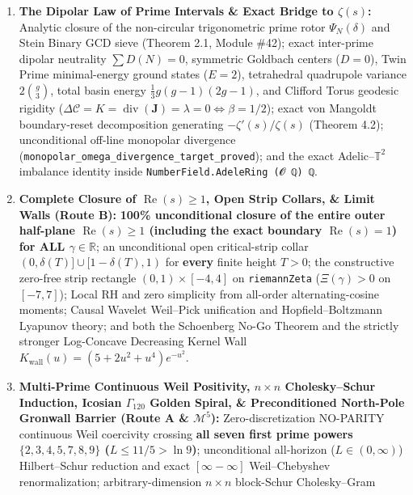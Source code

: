 \documentclass[
  11pt,
]{article}
\providecommand{\tightlist}{%
  \setlength{\itemsep}{0pt}\setlength{\parskip}{0pt}}
\begin{document}
\begin{enumerate}
\def\labelenumi{\arabic{enumi}.}
\tightlist
\item
  \textbf{The Dipolar Law of Prime Intervals \& Exact Bridge to
  \(\zeta(s)\):} Analytic closure of the non-circular trigonometric
  prime rotor \(\Psi_N(\delta)\) and Stein Binary GCD sieve (Theorem
  2.1, Module \#42); exact inter-prime dipolar neutrality
  \(\sum D(N) = 0\), symmetric Goldbach centers (\(D=0\)), Twin Prime
  minimal-energy ground states (\(E=2\)), tetrahedral quadrupole
  variance \(2\binom{g}{3}\), total basin energy
  \(\frac{1}{3}g(g-1)(2g-1)\), and Clifford Torus geodesic rigidity
  (\(\Delta\mathcal{C} = K = \operatorname{div}(\mathbf{J}) = \lambda = 0 \iff \beta = 1/2\));
  exact von Mangoldt boundary-reset decomposition generating
  \(-\zeta'(s)/\zeta(s)\) (Theorem 4.2); unconditional off-line
  monopolar divergence
  (\texttt{monopolar\_omega\_divergence\_target\_proved}); and the exact
  Adelic--\(\mathbb{T}^2\) imbalance identity inside
  \texttt{NumberField.AdeleRing\ (𝓞\ ℚ)\ ℚ}.
\item
  \textbf{Complete Closure of \(\operatorname{Re}(s) \ge 1\), Open Strip
  Collars, \& Limit Walls (Route B):} \textbf{100\% unconditional
  closure of the entire outer half-plane \(\operatorname{Re}(s) \ge 1\)
  (including the exact boundary \(\operatorname{Re}(s) = 1\)) for ALL
  \(\gamma \in \mathbb{R}\)}; an unconditional open critical-strip
  collar \((0, \delta(T)] \cup [1-\delta(T), 1)\) for \textbf{every}
  finite height \(T > 0\); the constructive zero-free strip rectangle
  \((0, 1) \times [-4, 4]\) on \texttt{riemannZeta} (\(\Xi(\gamma) > 0\)
  on \([-7, 7]\)); Local RH and zero simplicity from all-order
  alternating-cosine moments; Causal Wavelet Weil--Pick unification and
  Hopfield--Boltzmann Lyapunov theory; and both the Schoenberg No-Go
  Theorem and the strictly stronger Log-Concave Decreasing Kernel Wall
  \(K_{\text{wall}}(u) = (5+2u^2+u^4)e^{-u^2}\).
\item
  \textbf{Multi-Prime Continuous Weil Positivity, \(n \times n\)
  Cholesky--Schur Induction, Icosian \(\Gamma_{120}\) Golden Spiral, \&
  Preconditioned North-Pole Gronwall Barrier (Route A \&
  \(\mathcal{M}^5\)):} Zero-discretization NO-PARITY continuous Weil
  coercivity crossing \textbf{all seven first prime powers
  \(\{2, 3, 4, 5, 7, 8, 9\}\) (\(L \le 11/5 > \ln 9\))}; unconditional
  all-horizon (\(L \in (0, \infty)\)) Hilbert--Schur reduction and exact
  \([\infty - \infty]\) Weil--Chebyshev renormalization;
  arbitrary-dimension \(n \times n\) block-Schur Cholesky--Gram

\end{enumerate}
\end{document}
